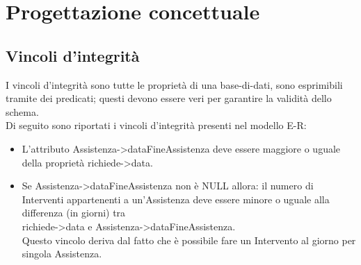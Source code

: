 \documentclass[legalpaper]{article}
\begin{document}
\section{Progettazione concettuale}

\subsection{Vincoli d'integrità}
I vincoli d'integrità sono tutte le proprietà di una base-di-dati, sono esprimibili 
tramite dei predicati; questi devono essere veri per garantire la validità dello schema.\\
\newline
Di seguito sono riportati i vincoli d'integrità presenti nel modello E-R:
\begin{itemize}
    \item L'attributo Assistenza->dataFineAssistenza deve essere maggiore o uguale\\ della proprietà richiede->data.
    \item Se Assistenza->dataFineAssistenza non è NULL allora: il numero di Interventi appartenenti a un'Assistenza deve essere minore o uguale alla differenza (in giorni) tra \\richiede->data e Assistenza->dataFineAssistenza.\\Questo vincolo deriva dal fatto che è possibile fare un Intervento al giorno per singola Assistenza.
 
\end{itemize}
\end{document}

